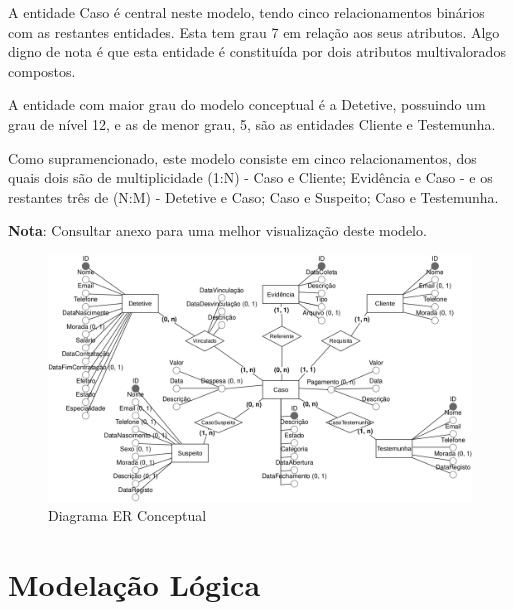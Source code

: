 \documentclass[a4paper,12pt]{scrreprt}
\begin{document}
        A entidade Caso é central neste modelo, tendo cinco relacionamentos binários com as restantes entidades. Esta tem grau 7 em relação aos seus atributos. Algo digno de nota é que esta entidade é constituída por dois atributos multivalorados compostos.

        A entidade com maior grau do modelo conceptual é a Detetive, possuindo um grau de nível 12, e as de menor grau, 5, são as entidades Cliente e Testemunha.

        Como supramencionado, este modelo consiste em cinco relacionamentos, dos quais dois são de multiplicidade (1:N) - Caso e Cliente; Evidência e Caso - e os restantes três de (N:M) - Detetive e Caso; Caso e Suspeito; Caso e Testemunha.

        \textbf{Nota}: Consultar anexo  para uma melhor visualização deste modelo.

        \clearpage
        \begin{figure}[!ht]
            \centering
            \includegraphics[scale=0.65, angle=270]{images/conceptual.png}
            \caption{Diagrama ER Conceptual}
            \label{fig:3.1}
        \end{figure}



\chapter{Modelação Lógica}
\end{document}
